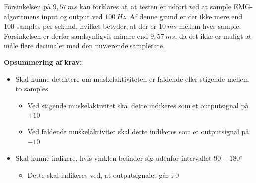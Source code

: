 Forsinkelsen på $9,57~ms$ kan forklares af, at testen er udført ved at sample EMG-algoritmens input og output ved $100~Hz$. Af denne grund er der ikke mere end 100 samples per sekund, hvilket betyder, at der er $10~ms$ mellem hver sample. Forsinkelsen er derfor sandsynligvis mindre end $9,57~ms$, da det ikke er muligt at måle flere decimaler med den nuværende samplerate. 

\vspace{3mm}
\textbf{Opsummering af krav:}
\begin{itemize}
\item[\text{\sffamily \checkmark}] Skal kunne detektere om muskelaktiviteten er faldende eller stigende mellem to samples 
\begin{itemize}
\item Ved stigende muskelaktivitet skal dette indikeres som et outputsignal på $+10$
\item Ved faldende muskelaktivitet skal dette indikeres som et outputsignal på $-10$
\end{itemize}
\item[\text{\sffamily \checkmark}] Skal kunne indikere, hvis vinklen befinder sig udenfor intervallet $90-180^{\circ}$
\begin{itemize}
\item Dette skal indikeres ved, at outputsignalet går i $0$
\end{itemize}
\end{itemize}
